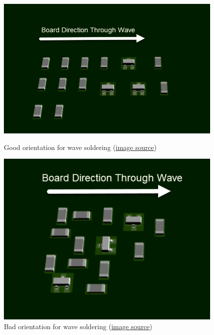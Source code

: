 \documentclass[final]{cubedoc}
\begin{document}
\begin{itemize}
		
		\begin{figure}[h!]
			\centering
			\begin{minipage}[b]{0.4\textwidth}
				\includegraphics[width=\textwidth]{assets/good_wave.png}
				\caption{Good orientation for wave soldering \small{(\href{https://web.archive.org/web/20200814195553/https://www.autodesk.com/products/eagle/blog/top-10-pcb-component-placement-tips-pcb-beginner/}{image source}})}
			\end{minipage}
			\hfill
			\begin{minipage}[b]{0.4\textwidth}
				\includegraphics[width=\textwidth]{assets/bad_wave.png}
				\caption{Bad orientation for wave soldering \small{(\href{https://web.archive.org/web/20200814195553/https://www.autodesk.com/products/eagle/blog/top-10-pcb-component-placement-tips-pcb-beginner/}{image source}})}
			\end{minipage}
		\end{figure}
		

\end{itemize}
\end{document}
